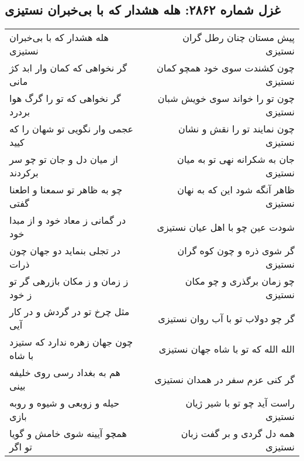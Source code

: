 \begin{center}
\section*{غزل شماره ۲۸۶۲: هله هشدار که با بی‌خبران نستیزی}
\label{sec:2862}
\begin{longtable}{l p{0.5cm} r}
هله هشدار که با بی‌خبران نستیزی
&&
پیش مستان چنان رطل گران نستیزی
\\
گر نخواهی که کمان وار ابد کژ مانی
&&
چون کشندت سوی خود همچو کمان نستیزی
\\
گر نخواهی که تو را گرگ هوا بردرد
&&
چون تو را خواند سوی خویش شبان نستیزی
\\
عجمی وار نگویی تو شهان را که کیید
&&
چون نمایند تو را نقش و نشان نستیزی
\\
از میان دل و جان تو چو سر برکردند
&&
جان به شکرانه نهی تو به میان نستیزی
\\
چو به ظاهر تو سمعنا و اطعنا گفتی
&&
ظاهر آنگه شود این که به نهان نستیزی
\\
در گمانی ز معاد خود و از مبدا خود
&&
شودت عین چو با اهل عیان نستیزی
\\
در تجلی بنماید دو جهان چون ذرات
&&
گر شوی ذره و چون کوه گران نستیزی
\\
ز زمان و ز مکان بازرهی گر تو ز خود
&&
چو زمان برگذری و چو مکان نستیزی
\\
مثل چرخ تو در گردش و در کار آیی
&&
گر چو دولاب تو با آب روان نستیزی
\\
چون جهان زهره ندارد که ستیزد با شاه
&&
الله الله که تو با شاه جهان نستیزی
\\
هم به بغداد رسی روی خلیفه بینی
&&
گر کنی عزم سفر در همدان نستیزی
\\
حیله و زوبعی و شیوه و روبه بازی
&&
راست آید چو تو با شیر ژیان نستیزی
\\
همچو آیینه شوی خامش و گویا تو اگر
&&
همه دل گردی و بر گفت زبان نستیزی
\\
\end{longtable}
\end{center}
